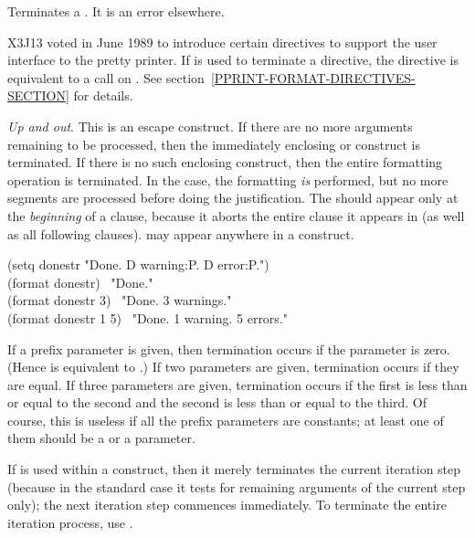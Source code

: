 \begin{flushdesc}
\item[\cd{{\Xtilde}>}]
Terminates a \cd{{\Xtilde}<}.  It is an error elsewhere.
\begin{new}
X3J13 voted in June 1989  to introduce
certain  directives to support the user interface to the pretty
printer.  If \cd{{\Xtilde}:>} is used to terminate a
 directive, the directive is equivalent to a call on
.
See section~\ref{PPRINT-FORMAT-DIRECTIVES-SECTION} for details.
\end{new}

\item[\cd{{\Xtilde}{\Xcircumflex}}]
\emph{Up and out}.
This is an escape construct.  If there are no more arguments remaining to
be processed, then the immediately enclosing \cd{{\Xtilde}{\Xlbrace}} or \cd{{\Xtilde}<} construct
is terminated.  If there is no such enclosing construct, then the entire
formatting operation is terminated.  In the \cd{{\Xtilde}<} case, the formatting
\emph{is} performed, but no more segments are processed before doing the
justification.  The \cd{{\Xtilde}{\Xcircumflex}} should appear only at the \emph{beginning} of a
\cd{{\Xtilde}<} clause, because it aborts the entire clause it appears in (as well
as all following clauses).
\cd{{\Xtilde}{\Xcircumflex}} may appear anywhere in a \cd{{\Xtilde}{\Xlbrace}}
construct.
\begin{lisp}
(setq donestr "Done.{\Xtilde}{\Xcircumflex}  {\Xtilde}D warning{\Xtilde}:P.{\Xtilde}{\Xcircumflex}  {\Xtilde}D error{\Xtilde}:P.") \\
(format {\false} donestr) \EV\ "Done." \\
(format {\false} donestr 3) \EV\ "Done.  3 warnings." \\
(format {\false} donestr 1 5) \EV\ "Done.  1 warning.  5 errors."
\end{lisp}

If a prefix parameter is given, then termination occurs if the parameter
is zero.  (Hence \cd{{\Xtilde}{\Xcircumflex}} is equivalent to \cd{{\Xtilde}\#{\Xcircumflex}}.)  If two
parameters are given, termination occurs if they are equal.  If three
parameters are given, termination occurs if the first is less than or
equal to the second and the second is less than or equal to the third.
Of course, this is useless if all the prefix parameters are constants; at
least one of them should be a \cd{\#} or a  parameter.

If \cd{{\Xtilde}{\Xcircumflex}} is used within a \cd{{\Xtilde}:{\Xlbrace}} construct, then it merely terminates
the current iteration step (because in the standard case it tests for
remaining arguments of the current step only); the next iteration step
commences immediately.  To terminate the entire iteration process,
use \cd{{\Xtilde}:{\Xcircumflex}}.


\end{flushdesc}
